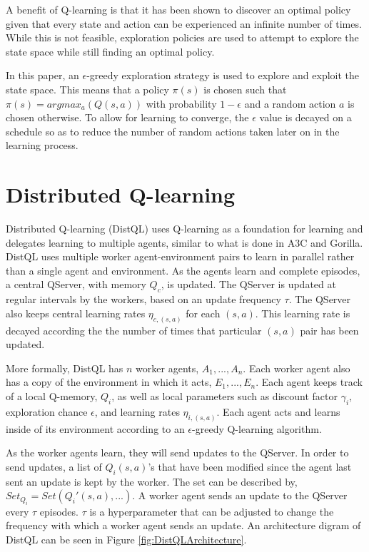 \documentclass[jair,twoside,11pt,theapa]{article}
\begin{document}
A benefit of Q-learning is that it has been shown to discover an optimal policy \cite{qlearning} given that every state and action can be experienced an infinite number of times. While this is not feasible, exploration policies are used to attempt to explore the state space while still finding an optimal policy. 

In this paper, an $\epsilon$-greedy exploration strategy is used to explore and exploit the state space. This means that a policy $\pi(s)$ is chosen such that $\pi(s)= argmax_{a}(Q(s,a))$ with probability $1-\epsilon$ and a random action $a$ is chosen otherwise. To allow for learning to converge, the $\epsilon$ value is decayed on a schedule so as to reduce the number of random actions taken later on in the learning process. 


\section{Distributed Q-learning} 
\label{algorithm}
Distributed Q-learning (DistQL) uses Q-learning as a foundation for learning and delegates learning to multiple agents, similar to what is done in A3C and Gorilla. DistQL uses multiple worker agent-environment pairs to learn in parallel rather than a single agent and environment. As the agents learn and complete episodes, a central QServer, with memory $Q_c$, is updated. The QServer is updated at regular intervals by the workers, based on an update frequency $\tau$. The QServer also keeps central learning rates $\eta_{c,(s,a)}$ for each $(s,a)$. This learning rate is decayed according the the number of times that particular $(s,a)$ pair has been updated. 

More formally, DistQL has $n$ worker agents, $A_1,..., A_n$. Each worker agent also has a copy of the environment in which it acts, $E_1,...,E_n$. Each agent keeps track of a local Q-memory, $Q_i$, as well as local parameters such as discount factor $\gamma_i$, exploration chance $\epsilon$, and learning rates $\eta_{i,(s,a)}$. Each agent acts and learns inside of its environment according to an $\epsilon$-greedy Q-learning algorithm.

As the worker agents learn, they will send updates to the QServer. In order to send updates, a list of $Q_i(s,a)$'s that have been modified since the agent last sent an update is kept by the worker. The set can be described by, $Set_{Q_i} = Set(Q_i'(s,a),...)$. A worker agent sends an update to the QServer every $\tau$ episodes. $\tau$ is a hyperparameter that can be adjusted to change the frequency with which a worker agent sends an update. An architecture digram of DistQL can be seen in Figure \ref{fig:DistQLArchitecture}. 
\end{document}
